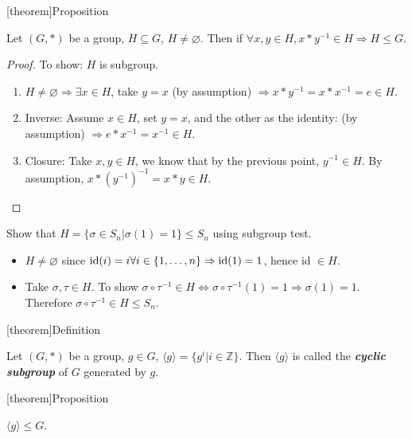 \documentclass[12pt]{report}
\theoremstyle{definition}
\begin{document}
[theorem]{Proposition}
\begin{subgroup test}
    Let $(G, *)$ be a group, $H \subseteq G$, $H \neq \varnothing$.
    Then if $\forall x, y \in H, x * y^{-1} \in H \Rightarrow{} H \le G$.
\end{subgroup test}

\begin{proof}
    To show: $H$ is subgroup.
    \begin{enumerate}
        \item $H \neq \varnothing \Rightarrow{} \exists x \in H$,
            take $y = x$ (by assumption) $\Rightarrow{} x*y^{-1} = x * x^{-1} = e \in H$.
        \item Inverse: Assume $x \in H$, set $y = x$, and the other as the identity:
            (by assumption) $\Rightarrow{} e * x^{-1} = x^{-1} \in H$.
        \item Closure: Take $x, y \in H$, we know that by the previous point, $y^{-1} \in H$.
        By assumption, $x * {(y^{-1})}^{-1} = x * y \in H$.
    \end{enumerate}
\end{proof}

\begin{ex}
    Show that $H = \{\sigma \in S_n | \sigma(1) = 1 \} \le S_n$ using subgroup test.
    \begin{itemize}
        \item $H \neq \varnothing$ since $\textnormal{id}(i) = i \forall i \in
            \{1, \ldots, n\} \Rightarrow{} \textnormal{id}(1) = 1$, hence id $\in H$.
        \item Take $\sigma, \tau \in H$. To show $\sigma \circ \tau^{-1} \in H
            \iff \sigma \circ \tau^{-1}(1) = 1 \Rightarrow{} \sigma(1) = 1$.
            Therefore $\sigma \circ \tau^{-1} \in H \le S_n$.
    \end{itemize}
\end{ex}

[theorem]{Definition}
\begin{cyclic subgroup}
    Let $(G, *)$ be a group, $g \in G$, $\langle g\rangle = \{g^{i} | i \in \mathbb{Z}\}$.
    Then $\langle g \rangle$ is called the \textbf{\emph{cyclic subgroup}} of $G$ generated by $g$.
\end{cyclic subgroup}

[theorem]{Proposition}
\begin{cyclic subgroup prop}
    $\langle g \rangle \le G$.
\end{cyclic subgroup prop}
\end{document}

